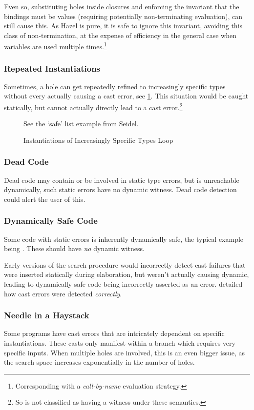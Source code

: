 Even so, substituting holes inside closures and enforcing the invariant that the bindings must be values (requiring potentially non-terminating evaluation), can still cause this. As Hazel is pure, it is safe to ignore this invariant, avoiding this class of non-termination, at the expense of efficiency in the general case when variables are used multiple times.\footnote{Corresponding with a \textit{call-by-name} evaluation strategy.}

\subsubsection{Repeated Instantiations}
Sometimes, a hole can get repeatedly refined to increasingly specific types without every actually causing a cast error, see \cref{fig:InfiniteInstantiations}. This situation would be caught statically, but cannot actually directly lead to a cast error.\footnote{So is not classified as having a witness under these semantics.} 

\begin{figure}[h]
See the `safe' list example from Seidel.
\caption{Instantiations of Increasingly Specific Types Loop}
\label{fig:InfiniteInstantiations}
\end{figure}

\subsubsection{Dead Code}
Dead code may contain or be involved in static type errors, but is unreachable dynamically, such static errors have no dynamic witness. Dead code detection \cite{DeadCodeDetection} could alert the user of this.

\subsubsection{Dynamically Safe Code}
Some code with static errors is inherently dynamically safe, the typical example being . These should have \textit{no} dynamic witness. 

Early versions of the search procedure would incorrectly detect cast failures that were inserted statically during elaboration, but weren't actually causing dynamic, leading to dynamically safe code being incorrectly asserted as an error.  detailed how cast errors were detected \textit{correctly}.

\subsubsection{Needle in a Haystack}
Some programs have cast errors that are intricately dependent on specific instantiations. These casts only manifest within a branch which requires very specific inputs. When multiple holes are involved, this is an even bigger issue, as the search space increases exponentially in the number of holes.

